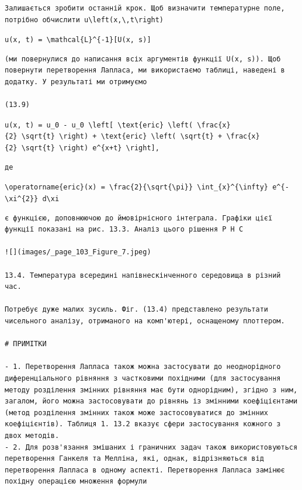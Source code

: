 \documentclass[
  ukrainian,
]{article}
\begin{document}
\begin{verbatim}
Залишається зробити останній крок. Щоб визначити температурне поле, потрібно обчислити u\left(x,\,t\right)
\end{verbatim}

\texttt{u(x,\ t)\ =\ \textbackslash{}mathcal\{L\}\^{}\{-1\}{[}U(x,\ s){]}}

\begin{verbatim}
(ми повернулися до написання всіх аргументів функції U(x, s)). Щоб повернути перетворення Лапласа, ми використаємо таблиці, наведені в додатку. У результаті ми отримуємо

(13.9)
\end{verbatim}

\texttt{u(x,\ t)\ =\ u\_0\ -\ u\_0\ \textbackslash{}left{[}\ \textbackslash{}text\{eric\}\ \textbackslash{}left(\ \textbackslash{}frac\{x\}\{2\}\ \textbackslash{}sqrt\{t\}\ \textbackslash{}right)\ +\ \textbackslash{}text\{eric\}\ \textbackslash{}left(\ \textbackslash{}sqrt\{t\}\ +\ \textbackslash{}frac\{x\}\{2\}\ \textbackslash{}sqrt\{t\}\ \textbackslash{}right)\ e\^{}\{x+t\}\ \textbackslash{}right{]},}

\begin{verbatim}
де
\end{verbatim}

\texttt{\textbackslash{}operatorname\{eric\}(x)\ =\ \textbackslash{}frac\{2\}\{\textbackslash{}sqrt\{\textbackslash{}pi\}\}\ \textbackslash{}int\_\{x\}\^{}\{\textbackslash{}infty\}\ e\^{}\{-\textbackslash{}xi\^{}\{2\}\}\ d\textbackslash{}xi}

\begin{verbatim}
є функцією, доповнюючою до ймовірнісного інтеграла. Графіки цієї функції показані на рис. 13.3. Аналіз цього рішення P H C

![](images/_page_103_Figure_7.jpeg)

13.4. Температура всередині напівнескінченного середовища в різний час.

Потребує дуже малих зусиль. Фіг. (13.4) представлено результати чисельного аналізу, отриманого на комп'ютері, оснащеному плоттером.

# ПРИМІТКИ

- 1. Перетворення Лапласа також можна застосувати до неоднорідного диференціального рівняння з частковими похідними (для застосування методу розділення змінних рівняння має бути однорідним), згідно з ним, загалом, його можна застосовувати до рівнянь із змінними коефіцієнтами (метод розділення змінних також може застосовуватися до змінних коефіцієнтів). Таблиця 1. 13.2 вказує сфери застосування кожного з двох методів.
- 2. Для розв'язання змішаних і граничних задач також використовуються перетворення Ганкеля та Мелліна, які, однак, відрізняються від перетворення Лапласа в одному аспекті. Перетворення Лапласа замінює похідну операцією множення формули
\end{verbatim}
\end{document}
